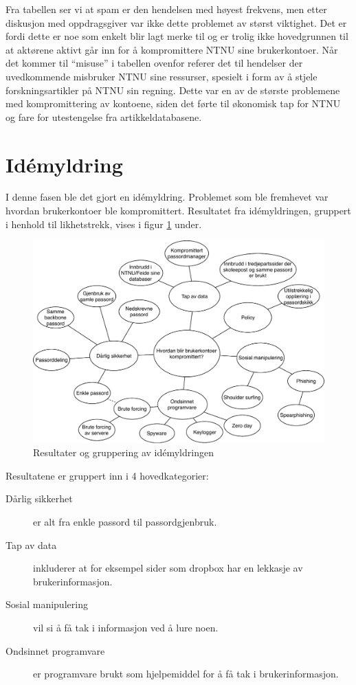 Fra tabellen ser vi at spam er den hendelsen med høyest frekvens, men etter diskusjon med oppdragsgiver var ikke dette problemet av størst viktighet. Det er fordi dette er noe som enkelt blir lagt merke til og er trolig ikke hovedgrunnen til at aktørene aktivt går inn for å kompromittere NTNU sine brukerkontoer. Når det kommer til ``misuse'' i tabellen ovenfor referer det til hendelser der uvedkommende misbruker NTNU sine ressurser, spesielt i form av å stjele forskningsartikler på NTNU sin regning. Dette var en av de største problemene med kompromittering av kontoene, siden det førte til økonomisk tap for NTNU og fare for utestengelse fra artikkeldatabasene. 

\section{Idémyldring}
I denne fasen ble det gjort en idémyldring. Problemet som ble fremhevet var hvordan brukerkontoer ble kompromittert. Resultatet fra idémyldringen, gruppert i henhold til likhetstrekk, vises i figur \ref{fig:case2-idemyldring} under. 

\begin{figure}[H]
    \centering
    \includegraphics[scale=0.6]{case_2/bilder/idemyldring.pdf}
    \caption[Idémyldring for kompromitterte kontoer]{Resultater og gruppering av idémyldringen}
    \label{fig:case2-idemyldring}
\end{figure}

Resultatene er gruppert inn i 4 hovedkategorier:
\begin{description}
    \item [Dårlig sikkerhet] er alt fra enkle passord til passordgjenbruk.
    \item [Tap av data] inkluderer at for eksempel sider som dropbox har en lekkasje av brukerinformasjon.
    \item [Sosial manipulering] vil si å få tak i informasjon ved å lure noen.
    \item [Ondsinnet programvare] er programvare brukt som hjelpemiddel for å få tak i brukerinformasjon.
\end{description}

